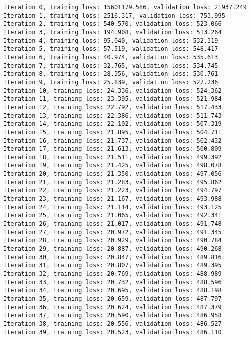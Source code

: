 \documentclass[11pt]{article}
\begin{document}
    \begin{Verbatim}[commandchars=\\\{\}]
Iteration 0, training loss: 15601179.586, validation loss: 21937.249
Iteration 1, training loss: 2516.317, validation loss: 753.995
Iteration 2, training loss: 540.570, validation loss: 523.066
Iteration 3, training loss: 194.908, validation loss: 513.264
Iteration 4, training loss: 95.040, validation loss: 532.319
Iteration 5, training loss: 57.519, validation loss: 548.417
Iteration 6, training loss: 40.974, validation loss: 535.613
Iteration 7, training loss: 32.765, validation loss: 534.745
Iteration 8, training loss: 28.356, validation loss: 530.761
Iteration 9, training loss: 25.839, validation loss: 527.236
Iteration 10, training loss: 24.336, validation loss: 524.362
Iteration 11, training loss: 23.395, validation loss: 521.984
Iteration 12, training loss: 22.792, validation loss: 517.433
Iteration 13, training loss: 22.386, validation loss: 511.743
Iteration 14, training loss: 22.102, validation loss: 507.319
Iteration 15, training loss: 21.895, validation loss: 504.711
Iteration 16, training loss: 21.737, validation loss: 502.432
Iteration 17, training loss: 21.613, validation loss: 500.809
Iteration 18, training loss: 21.511, validation loss: 499.392
Iteration 19, training loss: 21.425, validation loss: 498.078
Iteration 20, training loss: 21.350, validation loss: 497.056
Iteration 21, training loss: 21.283, validation loss: 495.862
Iteration 22, training loss: 21.223, validation loss: 494.797
Iteration 23, training loss: 21.167, validation loss: 493.988
Iteration 24, training loss: 21.114, validation loss: 493.125
Iteration 25, training loss: 21.065, validation loss: 492.341
Iteration 26, training loss: 21.017, validation loss: 491.748
Iteration 27, training loss: 20.972, validation loss: 491.345
Iteration 28, training loss: 20.929, validation loss: 490.784
Iteration 29, training loss: 20.887, validation loss: 490.268
Iteration 30, training loss: 20.847, validation loss: 489.816
Iteration 31, training loss: 20.807, validation loss: 489.395
Iteration 32, training loss: 20.769, validation loss: 488.989
Iteration 33, training loss: 20.732, validation loss: 488.596
Iteration 34, training loss: 20.695, validation loss: 488.198
Iteration 35, training loss: 20.659, validation loss: 487.797
Iteration 36, training loss: 20.624, validation loss: 487.379
Iteration 37, training loss: 20.590, validation loss: 486.958
Iteration 38, training loss: 20.556, validation loss: 486.527
Iteration 39, training loss: 20.523, validation loss: 486.110

\end{Verbatim}
\end{document}
